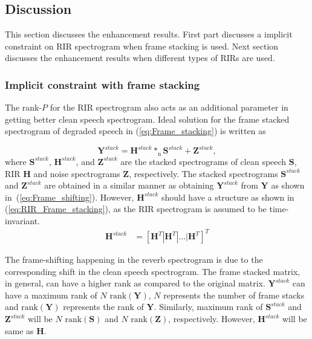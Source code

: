 \subsection{Discussion}
\label{sec:discussion}
This section discusses the enhancement results. First part discusses a implicit constraint on RIR spectrogram when frame stacking is used. Next section discusses the enhancement results when different types of RIRs are used.

\subsubsection{Implicit constraint with frame stacking}
\label{sec:RIRconstraint}
The rank-$P$ for the RIR spectrogram also acts as an additional parameter in getting better clean speech spectrogram. Ideal solution for the frame stacked spectrogram of degraded speech in (\ref{eq:Frame_stacking}) is written as 

\begin{equation}
\mathbf{Y}^{stack} = \mathbf{H}^{stack}*_\text{n} \mathbf{S}^{stack} + \mathbf{Z}^{stack},
\label{eq:Frame_stacking_solution}
\end{equation}
where $\mathbf{S}^{stack}$, $\mathbf{H}^{stack}$, and $\mathbf{Z}^{stack}$ are the stacked spectrograms of clean speech $\mathbf{S}$, RIR $\mathbf{H}$ and noise spectrograms $\mathbf{Z}$, respectively. The stacked spectrograms $\mathbf{S}^{stack}$ and $\mathbf{Z}^{stack}$ are obtained in a similar manner as obtaining $\mathbf{Y}^{stack}$ from $\mathbf{Y}$ as shown in~(\ref{eq:Frame_shifting}). However, $\mathbf{H}^{stack}$ should have a structure as shown in (\ref{eq:RIR_Frame_stacking}), as the RIR spectrogram is assumed to be time-invariant. 
\begin{align}
\mathbf{H}^{stack} &= [\mathbf{H}^T|\mathbf{H}^T|...|\mathbf{H}^T]^T
\label{eq:RIR_Frame_stacking}
\end{align}

The frame-shifting happening in the reverb spectrogram is due to the corresponding shift in the clean speech spectrogram.  
The frame stacked matrix, in general, can have a higher rank as compared to the original matrix. $\mathbf{Y}^{stack}$ can have a maximum rank of $N\text{ rank}(\mathbf{Y})$, $N$ represents the number of frame stacks and $\text{rank}({\mathbf{Y}})$ represents the rank of $\mathbf{Y}$. Similarly, maximum rank of $\mathbf{S}^{stack}$ and $\mathbf{Z}^{stack}$ will be $N\text{ rank}(\mathbf{S})$ and $N\text{ rank}(\mathbf{Z})$, respectively. However, $\mathbf{H}^{stack}$ will be same as $\mathbf{H}$. 

